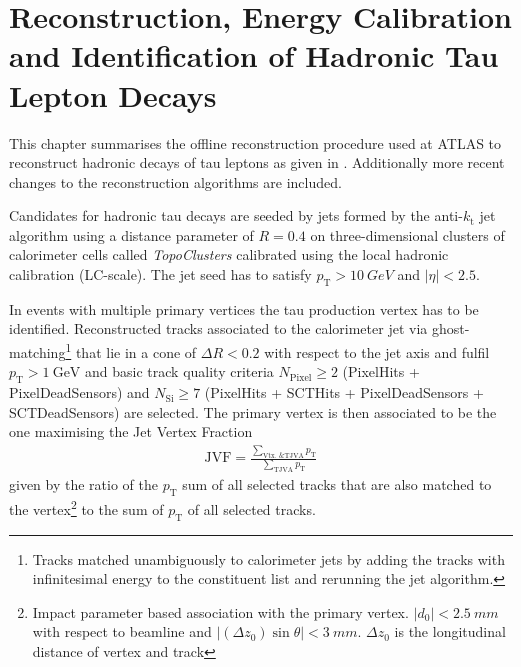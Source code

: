 \chapter{Reconstruction, Energy Calibration and
  Identification of Hadronic Tau Lepton Decays}
\label{sec:reconstruction}

This chapter summarises the offline reconstruction procedure used at ATLAS to
reconstruct hadronic decays of tau leptons as given in \cite{atlas:taurec:run1,
  atlas:taurec:run2}. Additionally more recent changes to the reconstruction
algorithms are included.

Candidates for hadronic tau decays are seeded by jets formed by the
anti-$k_\mathrm{t}$ jet algorithm using a distance parameter of $R = 0.4$ on
three-dimensional clusters of calorimeter cells called \emph{TopoClusters}
calibrated using the local hadronic calibration (LC-scale). The jet seed has to
satisfy $p_\mathrm{T} > \SI{10}{GeV}$ and $|\eta| < \num{2.5}$. 

In events with multiple primary vertices the tau production vertex has to be
identified. Reconstructed tracks associated to the calorimeter jet via
ghost-matching\footnote{Tracks matched unambiguously to calorimeter jets by
  adding the tracks with infinitesimal energy to the constituent list and
  rerunning the jet algorithm.} that lie in a cone of $\Delta R < 0.2$ with
respect to the jet axis and fulfil $p_\mathrm{T} > \SI{1}{\giga\electronvolt}$
and basic track quality criteria $N_\mathrm{Pixel} \geq 2$ (PixelHits +
PixelDeadSensors) and $N_\mathrm{Si} \geq 7$ (PixelHits + SCTHits +
PixelDeadSensors + SCTDeadSensors) are selected. The primary vertex is then
associated to be the one maximising the Jet Vertex Fraction
\begin{align*}
  \mathrm{JVF} = \frac{\sum_\text{Vtx.\ \& TJVA} p_\mathrm{T}}
                                           {\sum_\text{TJVA} p_\mathrm{T}}
\end{align*}
given by the ratio of the $p_\mathrm{T}$ sum of all selected tracks that are
also matched to the vertex\footnote{Impact parameter based association with the
  primary vertex. $|d_0| < \SI{2.5}{mm}$ with respect to beamline and
  $|(\Delta z_0) \sin\theta| < \SI{3}{mm}$. $\Delta z_0$ is the longitudinal
  distance of vertex and track} to the sum of $p_\mathrm{T}$ of all selected
tracks.

